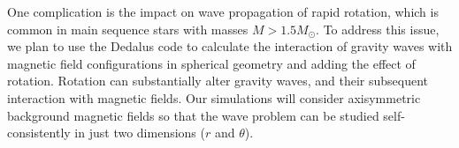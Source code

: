 One complication is the impact on wave propagation of rapid rotation, which is common in main sequence stars with masses $M > 1.5M_\odot$. To address this issue,
we plan to use the Dedalus code to calculate the interaction of gravity waves with  magnetic field configurations in spherical geometry \citep[e.g.][]{Braithwaite_2006} 
and adding the effect of rotation. Rotation can substantially alter gravity waves, and their subsequent interaction with magnetic fields. Our simulations will consider axisymmetric background magnetic fields so that the wave problem can be studied self-consistently in just two dimensions ($r$ and $\theta$). 